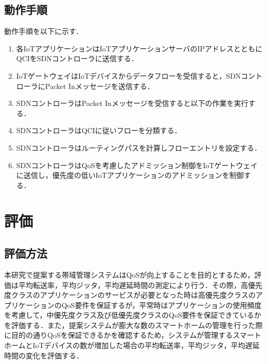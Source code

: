 \documentclass[a4paper,10pt,twocolumn,uplatex]{jsarticle}
\begin{document}
\subsection{動作手順}
動作手順を以下に示す．

\begin{enumerate} %
  \item 各IoTアプリケーションはIoTアプリケーションサーバのIPアドレスとともにQCIをSDNコントローラに送信する．
  \item IoTゲートウェイはIoTデバイスからデータフローを受信すると，SDNコントローラにPacket Inメッセージを送信する．
  \item SDNコントローラはPacket Inメッセージを受信すると以下の作業を実行する．
  \item SDNコントローラはQCIに従いフローを分類する．
  \item SDNコントローラはルーティングパスを計算しフローエントリを設定する．
  \item SDNコントローラはQoSを考慮したアドミッション制御をIoTゲートウェイに送信し，優先度の低いIoTアプリケーションのアドミッションを制御する．
\end{enumerate}

\section{評価}

\subsection{評価方法}
本研究で提案する帯域管理システムはQoSが向上することを目的とするため，評価は平均転送率，平均ジッタ，平均遅延時間の測定により行う．その際，高優先度クラスのアプリケーションのサービスが必要となった時は高優先度クラスのアプリケーションのQoS要件を保証するが，平常時はアプリケーションの使用頻度を考慮して，中優先度クラス及び低優先度クラスのQoS要件を保証できているかを評価する．また，提案システムが膨大な数のスマートホームの管理を行った際に目的の通りQoSを保証できるかを確認するため，システムが管理するスマートホームとIoTデバイスの数が増加した場合の平均転送率，平均ジッタ，平均遅延時間の変化を評価する．\par

\end{document}
